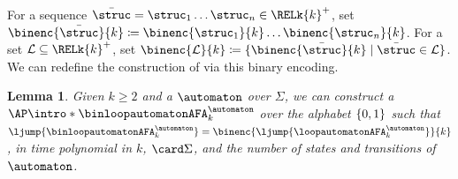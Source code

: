 \documentclass[10pt,a4paper]{article}
\newtheorem{lemma}[theorem]{Lemma}
\theoremstyle{definition}
\theoremstyle{remark}
\DeclarePairedDelimiter\set{\{}{\}}
\newcommand{\defeq}{\coloneq}
\newcommand{\mul}[1]{\bar{#1}}
\newcommand{\vsig}{\Sigma}
\begin{document}
For a sequence $\mul{\struc} = \struc_1 \dots \struc_n \in \RELk{k}^{+}$,
set $\binenc{\mul{\struc}}{k} \defeq \binenc{\struc_1}{k} \dots \binenc{\struc_n}{k}$.
For a set $\mathcal{L} \subseteq \RELk{k}^{+}$,
set $\binenc{\mathcal{L}}{k} \defeq \set{\binenc{\mul{\struc}}{k} \mid \mul{\struc} \in \mathcal{L}}$.
We can redefine the construction of  via this binary encoding.
\begin{lemma}\label{lemma: to binary AFA}
    Given $k \ge 2$ and a  $\automaton$ over $\vsig$,
    we can construct a  $\AP\intro*\binloopautomatonAFA_{k}^{\automaton}$ over the alphabet $\set{0,1}$
    such that $\ljump{\binloopautomatonAFA_{k}^{\automaton}} = \binenc{\ljump{\loopautomatonAFA_{k}^{\automaton}}}{k}$,
    in time polynomial in $k$, $\card\vsig$, and the number of states and transitions of $\automaton$.
\end{lemma}
\end{document}
